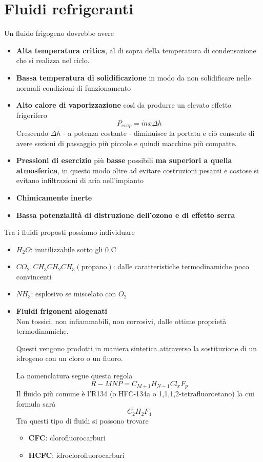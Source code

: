 \section{Fluidi refrigeranti}
\begin{adjustwidth}{2in}{}
	Un fluido frigogeno dovrebbe avere
	\begin{itemize}
		\item \textbf{Alta temperatura critica}, al di sopra della temperatura di condensazione che si realizza nel ciclo. 
		\item \textbf{Bassa temperatura di solidificazione} in modo da non solidificare nelle normali condizioni di funzionamento
		\item \textbf{Alto calore di vaporizzazione} così da produrre un elevato effetto frigorifero
		\[P_{evap} = \dot{m}x\Delta h\]
		Crescendo $\Delta h$ - a potenza costante - diminuisce la portata e ciò consente di avere sezioni di passaggio più piccole e quindi macchine più compatte. 
		\item \textbf{Pressioni di esercizio} più \textbf{basse} possibili \textbf{ma superiori a quella atmosferica}, in questo modo oltre ad evitare costruzioni pesanti e costose si evitano infiltrazioni di aria nell'impianto
		\item \textbf{Chimicamente inerte}
		\item \textbf{Bassa potenzialità di distruzione dell'ozono e di effetto serra}
	\end{itemize}
	Tra i fluidi proposti possiamo individuare
	\begin{itemize}
		\item $H_2O$: inutilizzabile sotto gli 0 \degree C
		\item $CO_2, CH_3CH_2CH_3 (\text{propano})$: dalle caratteristiche termodinamiche poco convincenti
		\item $NH_3$: esplosivo se miscelato con $O_2$
		\item \textbf{Fluidi frigoneni alogenati}\\
		Non tossici, non infiammabili, non corrosivi, dalle ottime proprietà termodinamiche. 
		
		Questi vengono prodotti in maniera sintetica attraverso la sostituzione di un idrogeno con un cloro o un fluoro. \newline 
		
		La nomenclatura segue questa regola 
		\[R-MNP = C_{M+1}H_{N-1}Cl_xF_p\]
		Il fluido più comune è l'R134 (o HFC-134a o 1,1,1,2-tetrafluoroetano) la cui formula sarà
		\[C_2H_2F_4\]
		Tra questi tipo di fluidi si possono trovare 
		\begin{itemize}
			\item \textbf{CFC}: clorofluorocarburi
			\item \textbf{HCFC}: idroclorofluorocarburi\\
			

\end{itemize}
\end{itemize}
\end{adjustwidth}
